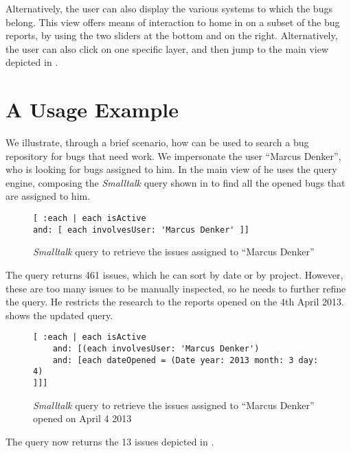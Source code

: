 Alternatively, the user can also display the various systems to which the bugs belong. This view offers means of interaction to home in on a subset of the bug reports, by using the two sliders at the bottom and on the right. Alternatively, the user can also click on one specific layer, and then jump to the main view depicted in .




\section{A Usage Example}

We illustrate, through a brief scenario, how \ib can be used to search a bug repository for bugs that need work. We impersonate the user ``Marcus Denker'', who is looking for bugs assigned to him. In the main view of \ib he uses the query engine, composing the \textit{Smalltalk} query shown in  to find all the opened bugs that are assigned to him.

\begin{figure}[ht]
{\scriptsize
\begin{verbatim}
[ :each | each isActive
and: [ each involvesUser: 'Marcus Denker' ]]
\end{verbatim}
}
\caption{\emph{Smalltalk} query to retrieve the issues assigned to ``Marcus Denker''}
\label{smalltalk-query-one}
\end{figure}

The query returns 461 issues, which he can sort by date or by project. However, these are too many issues to be manually inspected, so he needs to further refine the query. He restricts the research to the reports opened on the 4th April 2013.  shows the updated query.

\begin{figure}[ht]
{\scriptsize
\begin{verbatim}
[ :each | each isActive
	and: [(each involvesUser: 'Marcus Denker')
	and: [each dateOpened = (Date year: 2013 month: 3 day: 4)
]]]
\end{verbatim}
}
\caption{{\em Smalltalk} query to retrieve the issues assigned to ``Marcus Denker'' opened on April 4 2013}
\label{smalltalk-query-two}
\end{figure}

The query now returns the 13 issues depicted in .

